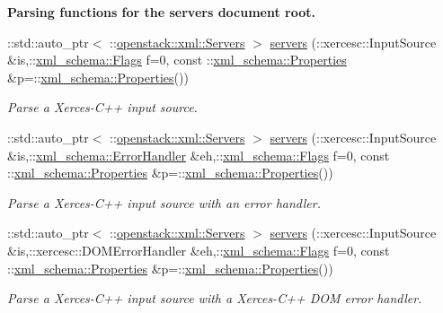 \begin{Indent}{\bf Parsing functions for the servers document root.}
\begin{DoxyCompactItemize}
::std::auto\_\-ptr$<$ ::\hyperlink{classopenstack_1_1xml_1_1Servers}{openstack::xml::Servers} $>$ \hyperlink{namespaceopenstack_1_1xml_a64ccd373015a10f35734c5a9785be90a}{servers} (::xercesc::InputSource \&is,::\hyperlink{namespacexml__schema_affb4c227cbd9aa7453dd1dc5a1401943}{xml\_\-schema::Flags} f=0, const ::\hyperlink{namespacexml__schema_ad27ce19a7ee1d3b1064092648898f64c}{xml\_\-schema::Properties} \&p=::\hyperlink{namespacexml__schema_ad27ce19a7ee1d3b1064092648898f64c}{xml\_\-schema::Properties}())
\begin{DoxyCompactList}\small\item\em Parse a Xerces-\/C++ input source. \item\end{DoxyCompactList}\item 
::std::auto\_\-ptr$<$ ::\hyperlink{classopenstack_1_1xml_1_1Servers}{openstack::xml::Servers} $>$ \hyperlink{namespaceopenstack_1_1xml_a41d9af5afebe801569c6fe380f405d08}{servers} (::xercesc::InputSource \&is,::\hyperlink{namespacexml__schema_ab1c9361bfd3b404eaabf0c31eded79dc}{xml\_\-schema::ErrorHandler} \&eh,::\hyperlink{namespacexml__schema_affb4c227cbd9aa7453dd1dc5a1401943}{xml\_\-schema::Flags} f=0, const ::\hyperlink{namespacexml__schema_ad27ce19a7ee1d3b1064092648898f64c}{xml\_\-schema::Properties} \&p=::\hyperlink{namespacexml__schema_ad27ce19a7ee1d3b1064092648898f64c}{xml\_\-schema::Properties}())
\begin{DoxyCompactList}\small\item\em Parse a Xerces-\/C++ input source with an error handler. \item\end{DoxyCompactList}\item 
::std::auto\_\-ptr$<$ ::\hyperlink{classopenstack_1_1xml_1_1Servers}{openstack::xml::Servers} $>$ \hyperlink{namespaceopenstack_1_1xml_af60a754a87c424854f5469ca19259a70}{servers} (::xercesc::InputSource \&is,::xercesc::DOMErrorHandler \&eh,::\hyperlink{namespacexml__schema_affb4c227cbd9aa7453dd1dc5a1401943}{xml\_\-schema::Flags} f=0, const ::\hyperlink{namespacexml__schema_ad27ce19a7ee1d3b1064092648898f64c}{xml\_\-schema::Properties} \&p=::\hyperlink{namespacexml__schema_ad27ce19a7ee1d3b1064092648898f64c}{xml\_\-schema::Properties}())
\begin{DoxyCompactList}\small\item\em Parse a Xerces-\/C++ input source with a Xerces-\/C++ DOM error handler. \item\end{DoxyCompactList}\item 

\end{DoxyCompactItemize}
\end{Indent}
